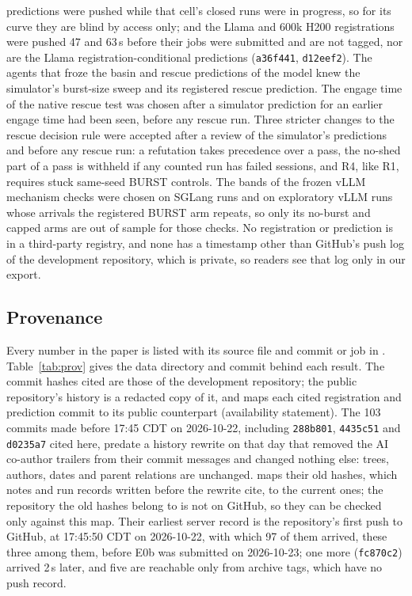 predictions were pushed while that cell's closed runs were in progress, so for its curve they are blind by access only; and the Llama and 600k H200 registrations were pushed 47 and 63\,s before their jobs were submitted and are not tagged, nor are the Llama registration-conditional predictions (\texttt{a36f441}, \texttt{d12eef2}). The agents that froze the basin and rescue predictions of the model knew the simulator's burst-size sweep and its registered rescue prediction. The engage time of the native rescue test was chosen after a simulator prediction for an earlier engage time had been seen, before any rescue run. Three stricter changes to the rescue decision rule were accepted after a review of the simulator's predictions and before any rescue run: a refutation takes precedence over a pass, the no-shed part of a pass is withheld if any counted run has failed sessions, and R4, like R1, requires stuck same-seed BURST controls. The bands of the frozen vLLM mechanism checks were chosen on SGLang runs and on exploratory vLLM runs whose arrivals the registered BURST arm repeats, so only its no-burst and capped arms are out of sample for those checks. No registration or prediction is in a third-party registry, and none has a timestamp other than GitHub's push log of the development repository, which is private, so readers see that log only in our export.

\subsection{Provenance}\label{app:prov}

Every number in the paper is listed with its source file and commit or job in . Table~\ref{tab:prov} gives the data directory and commit behind each result. The commit hashes cited are those of the development repository; the public repository's history is a redacted copy of it, and  maps each cited registration and prediction commit to its public counterpart (availability statement). The 103 commits made before 17:45 CDT on 2026-10-22, including \texttt{288b801}, \texttt{4435c51} and \texttt{d0235a7} cited here, predate a history rewrite on that day that removed the AI co-author trailers from their commit messages and changed nothing else: trees, authors, dates and parent relations are unchanged.  maps their old hashes, which notes and run records written before the rewrite cite, to the current ones; the repository the old hashes belong to is not on GitHub, so they can be checked only against this map. Their earliest server record is the repository's first push to GitHub, at 17:45:50 CDT on 2026-10-22, with which 97 of them arrived, these three among them, before E0b was submitted on 2026-10-23; one more (\texttt{fc870c2}) arrived 2\,s later, and five are reachable only from archive tags, which have no push record.


